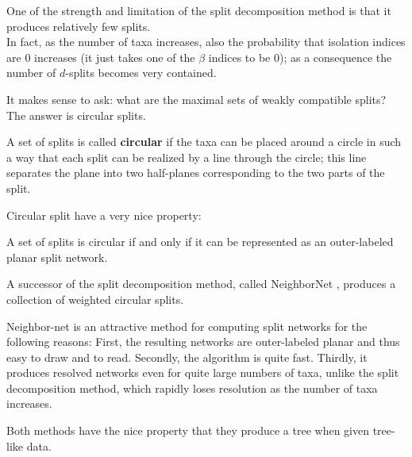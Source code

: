 \documentclass[./main.tex]{subfiles}
\begin{document}
One of the strength and limitation of the split decomposition method is that it produces relatively few splits. \\
In fact, as the number of taxa increases, also the probability that isolation indices are $0$ increases (it just takes one of the $\beta$ indices to be $0$); as a consequence the number of $d$-splits becomes very contained.

It makes sense to ask: what are the maximal sets of weakly compatible splits? The answer is circular splits.

A set of splits is called \textbf{circular} if the taxa can be placed around a circle in such a way that each split can be realized by a line through the circle; this line separates the plane into two half-planes corresponding to the two parts of the split.

Circular split have a very nice property:
\begin{remarklike}[Fact]
    A set of splits is circular if and only if it can be represented as an outer-labeled planar split network.
\end{remarklike}

\begin{figure}[h]
    \centering
\end{figure}

\clearpage

A successor of the split decomposition method, called NeighborNet \cite{BM04,BH23}, produces a collection of weighted circular splits.\bigskip

\begin{displayquote}
    Neighbor-net is an attractive method for computing split networks for the following reasons: First, the resulting networks are outer-labeled planar and thus easy to draw and to read. Secondly, the algorithm is quite fast. Thirdly, it produces resolved networks even for quite large numbers of taxa, unlike the split decomposition method, which rapidly loses resolution as the number of taxa increases.
\end{displayquote}

Both methods have the nice property that they produce a tree when given tree-like data.
\end{document}
